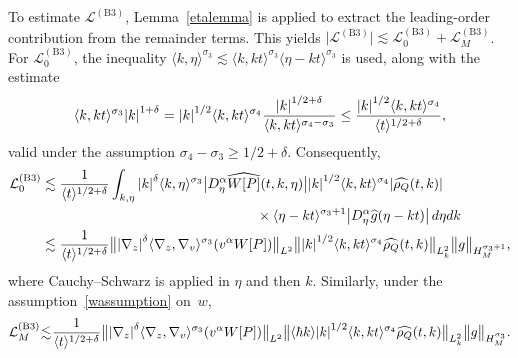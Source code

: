 \documentclass[JEP,XML,SOM,Unicode]{cedram}
\newcommand{\bnorm}[1]{\bigl\|#1\bigr\|}
\newcommand{\babs}[1]{\bigl|#1\bigr|}
\theoremstyle{plain}
\theoremstyle{remark}
\newcommand{\ak}{\abs{k}}
\newcommand{\jb}[1]{\langle#1\rangle}
\begin{document}
To estimate $\mathcal{L}^{\mathrm{(B3)}}$, Lemma~\ref{etalemma} is applied to extract the leading-order contribution from the remainder terms. This yields $\babs{\mathcal{L}^{\mathrm{(B3)}}}\lesssim\mathcal{L}_0^{\mathrm{(B3)}} + \mathcal{L}_M^{\mathrm{(B3)}}$. For $\mathcal{L}_0^{\mathrm{(B3)}}$, the inequality $\jb{k,\eta}^{\sigma_3}\lesssim\jb{k,kt}^{\sigma_3}\jb{\eta-kt}^{\sigma_3}$ is used, along with the estimate
\begin{align*}
\jb{k,kt}^{\sigma_3}\ak^{1+\delta}=\ak^{1/2}\jb{k,kt}^{\sigma_4}\frac{\ak^{1/2+\delta}}{\jb{k,kt}^{\sigma_4-\sigma_3}}\leq \frac{\ak^{1/2}\jb{k,kt}^{\sigma_4}}{\jb{t}^{1/2+\delta}} ,
\end{align*}valid under the assumption $\sigma_4-\sigma_3\geq1/2+\delta$. Consequently,
\begin{align*}
\mathcal{L}_0^{\mathrm{(B3)}}&\lesssim\frac{1}{\jb{t}^{1/2+\delta}}\int_{k,\eta}\abs{k}^\delta\jb{k,\eta}^{\sigma_3} \babs{D_\eta^\alpha \widehat{W[P]}(t,k,\eta)}\abs{k}^{1/2}\jb{k,kt}^{\sigma_4} \abs{\widehat{\rho_Q}(t,k)}\\
&\hspace{5.5cm}\times\jb{\eta-kt}^{\sigma_3+1}\abs{D^\alpha_\eta\widehat g(\eta-kt)}\,d\eta dk\\
&\lesssim\frac{1}{\jb{t}^{1/2+\delta}}\bnorm{\abs{\nabla_z}^\delta\jb{\nabla_z,\nabla_v}^{\sigma_3}(v^\alpha W[P])}_{L^2}\bnorm{\abs{k}^{1/2}\jb{k,kt}^{\sigma_4} \widehat{\rho_Q}(t,k)}_{L^2_k}\bnorm{g}_{H^{\sigma_3+1}_M},
\end{align*}
where Cauchy–Schwarz is applied in $\eta$ and then $k$. Similarly, under the assumption~\eqref{wassumption} on~$w$,
\begin{align*}
\mathcal{L}_M^{\mathrm{(B3)}}\hspace{-0.08cm}\lesssim\hspace{-0.08cm}\frac{1}{\jb{t}^{1/2+\delta}}\bnorm{\abs{\nabla_z}^\delta\jb{\nabla_z,\nabla_v}^{\sigma_3}(v^\alpha W[P])}_{L^2}\bnorm{\jb{\hbar k}\abs{k}^{1/2}\jb{k,kt}^{\sigma_4} \widehat{\rho_Q}(t,k)}_{L^2_k}\bnorm{g}_{H^{\sigma_3}_M}.
\end{align*}
\end{document}
